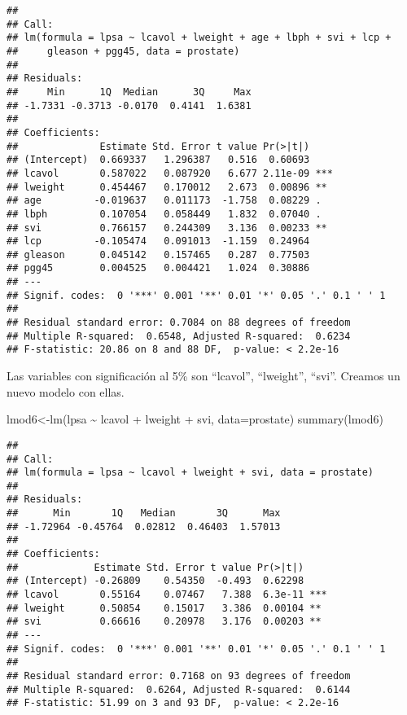 \documentclass[
]{article}
\newenvironment{Shaded}{\begin{snugshade}}{\end{snugshade}}
\newcommand{\AttributeTok}[1]{\textcolor[rgb]{0.77,0.63,0.00}{#1}}
\newcommand{\FunctionTok}[1]{\textcolor[rgb]{0.00,0.00,0.00}{#1}}
\newcommand{\NormalTok}[1]{#1}
\newcommand{\OtherTok}[1]{\textcolor[rgb]{0.56,0.35,0.01}{#1}}
\newcommand{\SpecialCharTok}[1]{\textcolor[rgb]{0.00,0.00,0.00}{#1}}
\begin{document}
\begin{verbatim}
## 
## Call:
## lm(formula = lpsa ~ lcavol + lweight + age + lbph + svi + lcp + 
##     gleason + pgg45, data = prostate)
## 
## Residuals:
##     Min      1Q  Median      3Q     Max 
## -1.7331 -0.3713 -0.0170  0.4141  1.6381 
## 
## Coefficients:
##              Estimate Std. Error t value Pr(>|t|)    
## (Intercept)  0.669337   1.296387   0.516  0.60693    
## lcavol       0.587022   0.087920   6.677 2.11e-09 ***
## lweight      0.454467   0.170012   2.673  0.00896 ** 
## age         -0.019637   0.011173  -1.758  0.08229 .  
## lbph         0.107054   0.058449   1.832  0.07040 .  
## svi          0.766157   0.244309   3.136  0.00233 ** 
## lcp         -0.105474   0.091013  -1.159  0.24964    
## gleason      0.045142   0.157465   0.287  0.77503    
## pgg45        0.004525   0.004421   1.024  0.30886    
## ---
## Signif. codes:  0 '***' 0.001 '**' 0.01 '*' 0.05 '.' 0.1 ' ' 1
## 
## Residual standard error: 0.7084 on 88 degrees of freedom
## Multiple R-squared:  0.6548, Adjusted R-squared:  0.6234 
## F-statistic: 20.86 on 8 and 88 DF,  p-value: < 2.2e-16
\end{verbatim}

Las variables con significación al 5\% son ``lcavol'', ``lweight'',
``svi''. Creamos un nuevo modelo con ellas.

\begin{Shaded}
\begin{Highlighting}[]
\NormalTok{lmod6}\OtherTok{\textless{}{-}}\FunctionTok{lm}\NormalTok{(lpsa }\SpecialCharTok{\textasciitilde{}}\NormalTok{ lcavol }\SpecialCharTok{+}\NormalTok{ lweight }\SpecialCharTok{+}\NormalTok{ svi, }\AttributeTok{data=}\NormalTok{prostate)}
\FunctionTok{summary}\NormalTok{(lmod6)}
\end{Highlighting}
\end{Shaded}

\begin{verbatim}
## 
## Call:
## lm(formula = lpsa ~ lcavol + lweight + svi, data = prostate)
## 
## Residuals:
##      Min       1Q   Median       3Q      Max 
## -1.72964 -0.45764  0.02812  0.46403  1.57013 
## 
## Coefficients:
##             Estimate Std. Error t value Pr(>|t|)    
## (Intercept) -0.26809    0.54350  -0.493  0.62298    
## lcavol       0.55164    0.07467   7.388  6.3e-11 ***
## lweight      0.50854    0.15017   3.386  0.00104 ** 
## svi          0.66616    0.20978   3.176  0.00203 ** 
## ---
## Signif. codes:  0 '***' 0.001 '**' 0.01 '*' 0.05 '.' 0.1 ' ' 1
## 
## Residual standard error: 0.7168 on 93 degrees of freedom
## Multiple R-squared:  0.6264, Adjusted R-squared:  0.6144 
## F-statistic: 51.99 on 3 and 93 DF,  p-value: < 2.2e-16
\end{verbatim}
\end{document}
